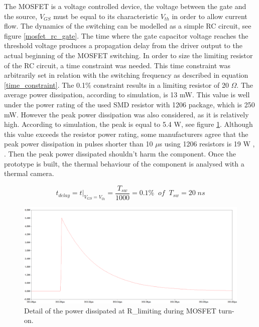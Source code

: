 The MOSFET is a voltage controlled device, the voltage between the gate and the source, $V_{GS}$ must be equal to its characteristic $V_{th}$ in order to allow current flow. The dynamics of the switching can be modelled as a simple RC circuit, see figure \ref{mosfet_rc_gate}. The time where the gate capacitor voltage reaches the threshold voltage produces a propagation delay from the driver output to the actual beginning of the MOSFET switching. In order to size the limiting resistor of the RC circuit, a time constraint was needed. This time constraint was arbitrarily set in relation with the switching frequency as described in equation \ref{time_constraint}. The 0.1\% constraint results in a limiting resistor of 20 $\Omega$. The average power dissipation, according to simulation, is 13 mW. This value is well under the power rating of the used SMD resistor with 1206 package, which is 250 mW. However the peak power dissipation was also considered, as it is relatively high. According to simulation, the peak is equal to 5.4 W, see figure \ref{gate_resistor_power_dissipation}. Although this value exceeds the resistor power rating, some manufacturers agree that the peak power dissipation in pulses shorter than 10 $\mu$s using 1206 resistors is 19 W \cite{pulse_withstanding_chip_resistors}, \cite{gate_driver_design_infineon}. Then the peak power dissipated shouldn't harm the component. Once the prototype is built, the thermal behaviour of the component is analysed with a thermal camera. 

\begin{equation} \label{time_constraint}
t_{delay} = t\big\rvert_{V_{GS} = V_{th}} =\frac{T_{sw}}{1000} = 0.1 \% \;\; of \;\; T_{sw} = 20 \; ns
\end{equation}


\begin{figure}[htbp]
	\begin{center}
		\includegraphics[width=1.15\textwidth]{../Pictures/P1/Component_sizing/Gate_resistor_power_dissipation.png}
		\caption{Detail of the power dissipated at R\_limiting during MOSFET turn-on.}
		\label{gate_resistor_power_dissipation}
	\end{center}	
\end{figure}
 
